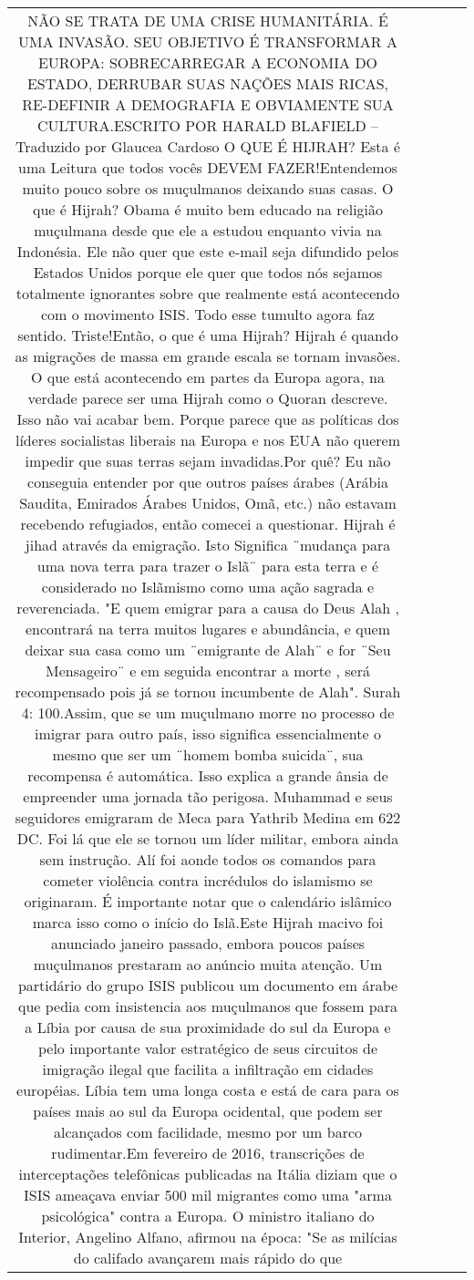 \documentclass[11pt]{article}
\newlength\mylength
\begin{document}
\begin{center}
\begin{longtable}{|C{.65\mylength}|C{.30\mylength}|C{.12\mylength}|C{.12\mylength}|C{.12\mylength}|}
  \small NÃO SE TRATA DE UMA CRISE HUMANITÁRIA. É UMA INVASÃO. SEU OBJETIVO É TRANSFORMAR A EUROPA: SOBRECARREGAR A ECONOMIA DO ESTADO, DERRUBAR SUAS NAÇÕES MAIS RICAS, RE-DEFINIR A DEMOGRAFIA E OBVIAMENTE SUA CULTURA.ESCRITO POR HARALD BLAFIELD – Traduzido por Glaucea Cardoso  O QUE É HIJRAH? Esta é uma Leitura que todos vocês DEVEM FAZER!Entendemos muito pouco sobre os muçulmanos deixando suas casas. O que é Hijrah? Obama é muito bem educado na religião muçulmana desde que ele a estudou enquanto vivia na Indonésia. Ele não quer que este e-mail seja difundido pelos Estados Unidos porque ele quer que todos nós sejamos totalmente ignorantes sobre que realmente está acontecendo com o movimento ISIS. Todo esse tumulto agora faz sentido. Triste!Então, o que é uma Hijrah? Hijrah é quando as migrações de massa em grande escala se tornam invasões. O que está acontecendo em partes da Europa agora, na verdade parece ser uma Hijrah como o Quoran descreve. Isso não vai acabar bem. Porque parece que as políticas dos líderes socialistas liberais na Europa e nos EUA não querem impedir que suas terras sejam invadidas.Por quê? Eu não conseguia entender por que outros países árabes (Arábia Saudita, Emirados Árabes Unidos, Omã, etc.) não estavam recebendo refugiados, então comecei a questionar. Hijrah é jihad através da emigração. Isto Significa ¨mudança para uma nova terra para trazer o Islã¨ para esta terra e é considerado no Islãmismo como uma ação sagrada e reverenciada. "E quem emigrar para a causa do Deus Alah , encontrará na terra muitos lugares e abundância, e quem deixar sua casa como um ¨emigrante de Alah¨ e for ¨Seu Mensageiro¨ e em seguida encontrar a morte , será recompensado pois já se tornou incumbente de Alah". Surah 4: 100.Assim, que se um muçulmano morre no processo de imigrar para outro país, isso significa essencialmente o mesmo que ser um ¨homem bomba suicida¨, sua recompensa é automática. Isso explica a grande ânsia de empreender uma jornada tão perigosa. Muhammad e seus seguidores emigraram de Meca para Yathrib  Medina em 622 DC. Foi lá que ele se tornou um líder militar, embora ainda sem instrução. Alí foi aonde todos os comandos para cometer violência contra incrédulos do islamismo se originaram. É importante notar que o calendário islâmico marca isso como o início do Islã.Este Hijrah macivo foi anunciado janeiro passado, embora poucos países muçulmanos prestaram ao anúncio muita atenção. Um partidário do grupo ISIS publicou um documento em árabe que pedia com insistencia aos muçulmanos que fossem para a Líbia por causa de sua proximidade do sul da Europa e pelo importante valor estratégico de seus circuitos de imigração ilegal que facilita a infiltração em cidades européias. Líbia tem uma longa costa e está de cara para os países mais ao sul da Europa ocidental, que podem ser alcançados com facilidade, mesmo por um barco rudimentar.Em fevereiro de 2016, transcrições de interceptações telefônicas publicadas na Itália diziam que o ISIS ameaçava enviar 500 mil migrantes como uma "arma psicológica" contra a Europa. O ministro italiano do Interior, Angelino Alfano, afirmou na época: "Se as milícias do califado avançarem mais rápido do que 
\end{longtable}
\end{center}
\end{document}
